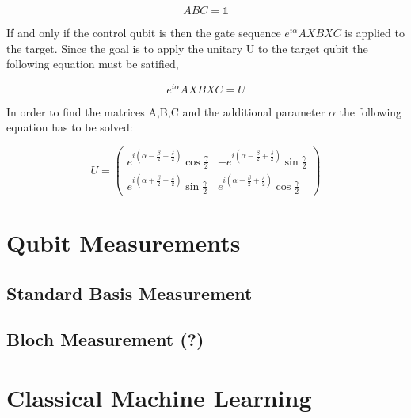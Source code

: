 \begin{equation}
ABC = \mathbb{1}
\end{equation}

If and only if the control qubit is \1 then the gate sequence $e^{i\alpha}AXBXC$ is applied to the target. Since the goal is to apply the unitary U to the target qubit the following equation must be satified,

\begin{equation}
e^{i\alpha}AXBXC = U
\end{equation}

In order to find the matrices A,B,C and the additional parameter $\alpha$ the following equation has to be solved:

\begin{equation}
U = \begin{pmatrix}
 e^{i(\alpha-\frac{\beta}{2}-\frac{\delta}{2})}\cos{\frac{\gamma}{2}} & -e^{i(\alpha-\frac{\beta}{2}+\frac{\delta}{2})}\sin{\frac{\gamma}{2}} \\ 
e^{i(\alpha+\frac{\beta}{2}-\frac{\delta}{2})}\sin{\frac{\gamma}{2}} & e^{i(\alpha+\frac{\beta}{2}+\frac{\delta}{2})}\cos{\frac{\gamma}{2}}
 \end{pmatrix}
\end{equation}



\section{Qubit Measurements}
\label{subsec:qubitmeasurements}

\subsection{Standard Basis Measurement}
\label{subsubsec:standardbasismeasurement}

\subsection{Bloch Measurement (?)}
\label{subsubsec:blochmeasurement}



\section{Classical Machine Learning}
\label{subsec:classicalmachinelearning}


